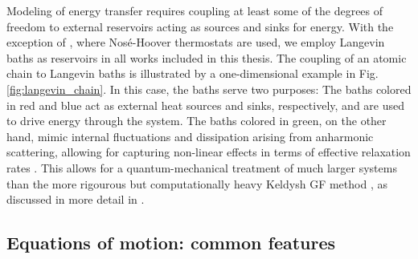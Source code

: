 Modeling of energy transfer requires coupling at least some of the degrees of freedom to external reservoirs acting as sources and sinks for energy. With the exception of , where Nos\'e-Hoover thermostats \cite{nose84} are used, we employ Langevin baths as reservoirs in all works included in this thesis. The coupling of an atomic chain to Langevin baths is illustrated by a one-dimensional example in Fig. \ref{fig:langevin_chain}. In this case, the baths serve two purposes: The baths colored in red and blue act as external heat sources and sinks, respectively, and are used to drive energy through the system. The baths colored in green, on the other hand, mimic internal fluctuations and dissipation arising from anharmonic scattering, allowing for capturing non-linear effects in terms of effective relaxation rates \cite{bolsterli70}. This allows for a quantum-mechanical treatment of much larger systems than the more rigourous but computationally heavy Keldysh GF method \cite{haugjauho}, as discussed in more detail in . 

\subsection{Equations of motion: common features}
\label{sec:th_eom}

